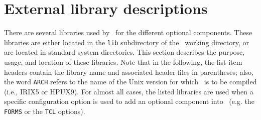 \section{External library descriptions}

There are several libraries used by \VMD\ for the different optional components.  These libraries are either located in the {\tt lib} subdirectory of the \VMD\ working directory, or are located in standard system directories.  This section describes the purpose, usage, and location of these libraries.  Note that in the following, the list item headers contain the library name and associated header files in parentheses; also, the word {\tt ARCH} refers to the name of the Unix version for which \VMD\ is to be compiled (i.e., IRIX5 or HPUX9).  For almost all cases, the listed libraries are used when a specific configuration option is used to add an optional component into \VMD\ (e.g. the {\tt FORMS} or the {\tt TCL} options).

